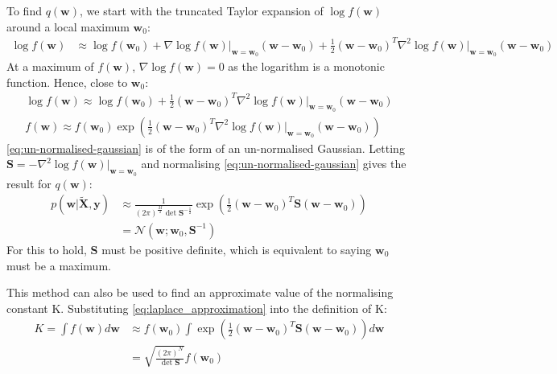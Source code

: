 \documentclass[a4paper]{article}
\begin{document}
    To find $q(\bm{w})$, we start with the truncated Taylor expansion of $\log f(\bm{w})$ around a local maximum $\bm{w}_0$:
    \begin{align}
        \nonumber
        \log f(\bm{w}) &\approx \log f(\bm{w}_0) + \nabla \log f(\bm{w}) \big|_{\bm{w} = \bm{w}_0} (\bm{w} - \bm{w}_0)
        + \frac{1}{2} (\bm{w} - \bm{w}_0)^T \nabla^2 \log f(\bm{w}) \big|_{\bm{w} = \bm{w}_0} (\bm{w} - \bm{w}_0)
    \end{align}
    At a maximum of $f(\bm{w})$, $\nabla \log f(\bm{w}) = 0$ as the logarithm is a monotonic function.
    Hence, close to $\bm{w}_0$:
    \begin{align}
        \log f(\bm{w}) \approx \log f(\bm{w}_0) + \frac{1}{2} (\bm{w} - \bm{w}_0)^T \nabla^2 \log f(\bm{w}) \big|_{\bm{w} = \bm{w}_0} (\bm{w} - \bm{w}_0) \nonumber \\
        f(\bm{w}) \approx f(\bm{w}_0) \exp \left(\frac{1}{2} (\bm{w} - \bm{w}_0)^T \nabla^2 \log f(\bm{w}) \big|_{\bm{w} = \bm{w}_0} (\bm{w} - \bm{w}_0) \right)
        \label{eq:un-normalised-gaussian}
    \end{align}
    \autoref{eq:un-normalised-gaussian} is of the form of an un-normalised Gaussian. Letting $\bm{S} = -\nabla^2 \log f(\bm{w})\big|_{\bm{w} = \bm{w}_0}$ and normalising \autoref{eq:un-normalised-gaussian} gives the result for $q(\bm{w})$:
    \begin{align}
        p(\bm{w} | \tilde{\bm{X}}, \bm{y}) &\approx \frac{1}{(2\pi)^\frac{M}{2} \det\bm{S}^{-\frac{1}{2}}} \exp \left(\frac{1}{2} (\bm{w} - \bm{w}_0)^T \bm{S} (\bm{w} - \bm{w}_0) \right) \nonumber \\
        &= \mathcal{N}(\bm{w}; \bm{w}_0, \bm{S}^{-1})
        \label{eq:laplace_approximation}
    \end{align}
    For this to hold, $\bm{S}$ must be positive definite, which is equivalent to saying $\bm{w}_0$ must be a maximum.

    This method can also be used to find an approximate value of the normalising constant K.
    Substituting \autoref{eq:laplace_approximation} into the definition of K:
    \begin{align}
        K = \int f(\bm{w}) d\bm{w} &\approx f(\bm{w}_0) \int \exp \left(\frac{1}{2} (\bm{w} - \bm{w}_0)^T \bm{S} (\bm{w} - \bm{w}_0) \right) d\bm{w} \nonumber \\
        &= \sqrt{\frac{(2\pi)^N}{\det \bm{S}}} f(\bm{w}_0)
        \label{eq:normalising_constant}
    \end{align}
\end{document}
